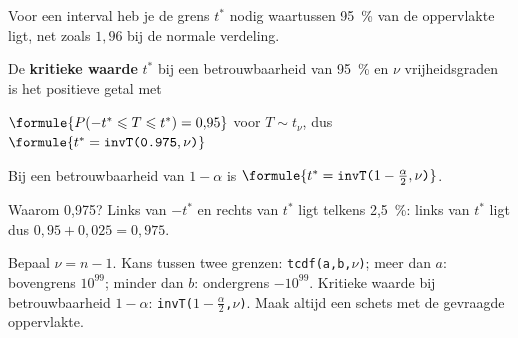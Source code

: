 Voor een interval heb je de grens $t^*$ nodig waartussen 95~\% van de oppervlakte ligt, net zoals $1{,}96$ bij de normale verdeling.

\begin{theorie}
De \textbf{\textcolor{accent}{kritieke waarde}} $t^*$ bij een betrouwbaarheid van 95~\% en $\nu$ vrijheidsgraden is het positieve getal met

\vspace{1mm}
\qquad $\formule{P(-t^* \leqslant T \leqslant t^*) = 0{,}95}$ \quad voor $T \sim t_\nu$, \quad dus \quad $\formule{t^* = \texttt{invT(0.975}, \nu\texttt{)}}$

\vspace{1mm}
Bij een betrouwbaarheid van $1 - \alpha$ is $\formule{t^* = \texttt{invT(}1 - \tfrac{\alpha}{2}, \nu\texttt{)}}$.
\end{theorie}

Waarom 0,975? Links van $-t^*$ en rechts van $t^*$ ligt telkens 2,5~\%: links van $t^*$ ligt dus $0{,}95 + 0{,}025 = 0{,}975$.


\begin{werkwijze}
Bepaal $\nu = n - 1$. Kans tussen twee grenzen: \texttt{tcdf(a,b,$\nu$)}; meer dan $a$: bovengrens $10^{99}$; minder dan $b$: ondergrens $-10^{99}$. Kritieke waarde bij betrouwbaarheid $1 - \alpha$: \texttt{invT(}$1 - \frac{\alpha}{2}$\texttt{,$\nu$)}. Maak altijd een schets met de gevraagde oppervlakte.
\end{werkwijze}

